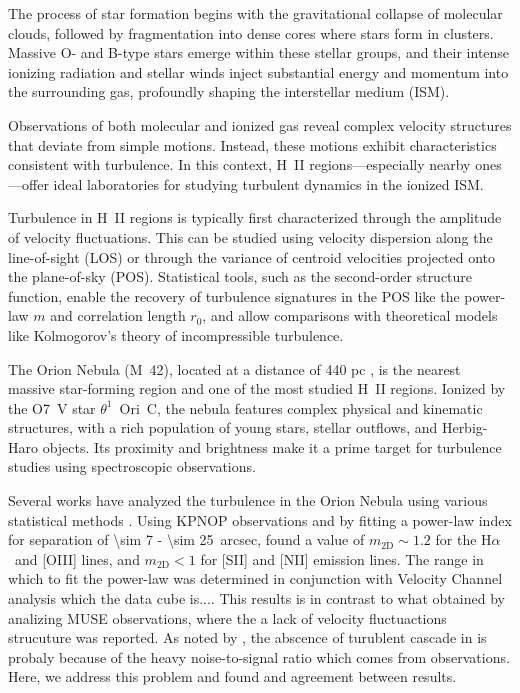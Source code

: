 \documentclass[fleqn,usenatbib, useAMS, a4paper]{mnras}
\newcommand\halpha{H${\alpha}$}
\begin{document}
The process of star formation begins with the gravitational collapse of molecular clouds, followed by fragmentation into dense cores where stars form in clusters. 
Massive O- and B-type stars emerge within these stellar groups, and their intense ionizing radiation and stellar winds inject substantial energy and momentum into the surrounding gas, profoundly shaping the interstellar medium (ISM).

Observations of both molecular and ionized gas reveal complex velocity structures that deviate from simple motions. 
Instead, these motions exhibit characteristics consistent with turbulence. 
In this context, H~II regions—especially nearby ones—offer ideal laboratories for studying turbulent dynamics in the ionized ISM.

Turbulence in H~II regions is typically first characterized through the amplitude of velocity fluctuations. This can be studied using velocity dispersion along the line-of-sight (LOS) or through the variance of centroid velocities projected onto the plane-of-sky (POS). 
Statistical tools, such as the second-order structure function, enable the recovery of turbulence signatures in the POS like the power-law $m$ and correlation length \(r_0\), and allow comparisons with theoretical models like Kolmogorov’s theory of incompressible turbulence.



The Orion Nebula (M~42), located at a distance of 440 pc \citetext{\SI{1}{\arcsecond} = \SI{0.002}{pc}; \citealp{2008AJ....136.1566O}}, is the nearest massive star-forming region and one of the most studied H~II regions. 
Ionized by the O7~V star $\theta^1$~Ori~C, the nebula features complex physical and kinematic structures, with a rich population of young stars, stellar outflows, and Herbig-Haro objects. 
Its proximity and brightness make it a prime target for turbulence studies using spectroscopic observations.

Several works have analyzed the turbulence in the Orion Nebula using various statistical methods \citep{von1951methode, munch1958internal, castaneda1988, 1992ApJ...387..229O, 2016MNRAS.455.4057M, arthur2016turbulence, 2016MNRAS.455.4057M}. 
Using KPNOP observations and by fitting a power-law index for separation of \num{\sim 7} - \SI{\sim 25}{arcsec}, \citet{arthur2016turbulence} found a value of \(m_\text{2D} \sim 1.2\) for the \halpha\ and [OIII] lines, and  \(m_\text{2D} < 1\) for [SII] and [NII] emission lines. 
The range in which to fit the power-law was determined in conjunction with Velocity Channel analysis which the data cube is....
This results is in contrast to what \citet{2016MNRAS.455.4057M} obtained by analizing MUSE observations, where the a lack of velocity fluctuactions strucuture was reported.
As noted by \citet{arthur2016turbulence}, the abscence of turublent cascade in \citet{2016MNRAS.455.4057M} is probaly because of the heavy noise-to-signal ratio which comes from observations.
Here, we address this problem and found and agreement between results.
\end{document}
